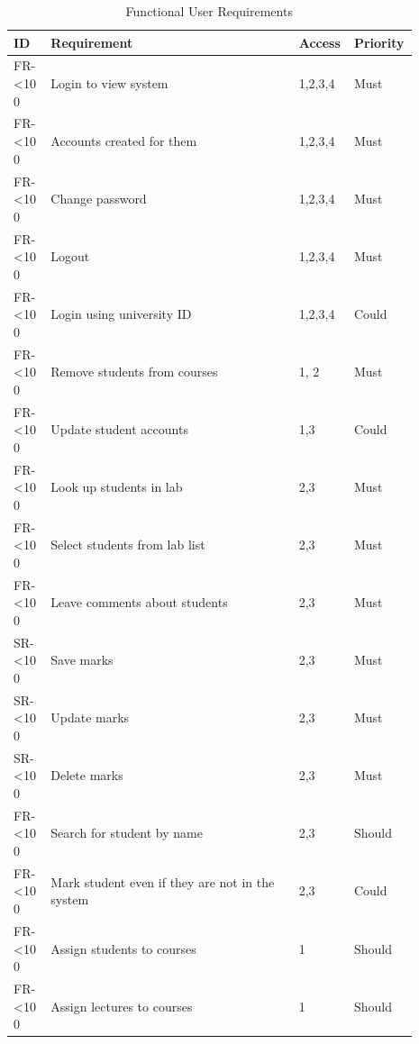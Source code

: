 \documentclass[12pt]{article}  %
\newcommand{\rid}[1]{\centering #1-\ifnum\value{requirement}<10 0\fi\arabic{requirement}
\stepcounter{requirement}}
\begin{document}
\begin{spacing}{1.5}
\begin{longtable}{|p{0.09\linewidth}|p{0.6\linewidth}|p{0.1\linewidth}|
p{0.1\linewidth}|}
\caption{Functional User Requirements} \label{table:funct-user} \\ \hline
\textbf{ID} & \textbf{Requirement} & \textbf{Access} & \textbf{Priority}\\
\hline \hline

\rid{FR} &  Login to view system & 1,2,3,4 & Must\\ \hline
\rid{FR} &  Accounts created for them & 1,2,3,4 & Must\\ \hline
\rid{FR} &  Change password & 1,2,3,4 & Must\\ \hline
\rid{FR} &  Logout & 1,2,3,4 & Must \\ \hline
\rid{FR} &  Login using university ID & 1,2,3,4 & Could\\ \hline

\rid{FR} &  Remove students from courses & 1, 2 & Must\\ \hline
\rid{FR} &  Update student accounts & 1,3 & Could \\ \hline

\rid{FR} &  Look up students in lab & 2,3 & Must\\ \hline
\rid{FR} &  Select students from lab list & 2,3 & Must\\ \hline
\rid{FR} &  Leave comments about students & 2,3 & Must\\ \hline
\rid{SR} &  Save marks & 2,3 & Must\\ \hline
\rid{SR} &  Update marks & 2,3 & Must\\ \hline
\rid{SR} &  Delete marks & 2,3 & Must\\ \hline
\rid{FR} &  Search for student by name & 2,3 & Should\\ \hline
\rid{FR} &  Mark student even if they are not in the system & 2,3 & Could \\ \hline

\rid{FR} &  Assign students to courses & 1 & Should\\ \hline
\rid{FR} &  Assign lectures to courses & 1 & Should\\ \hline


\end{longtable}
\end{spacing}
\end{document}
